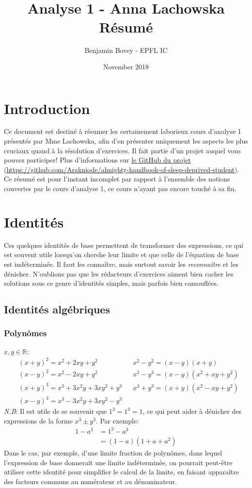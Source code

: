 \documentclass{article}
\title{\vspace{-1.5cm}	Analyse 1 -  Anna Lachowska \\
							Résumé}
\author{Benjamin Bovey - EPFL IC}
\date{November 2018}
\numberwithin{equation}{section}
\begin{document}
\maketitle

\section*{Introduction}
Ce document est destiné à résumer les certainement laborieux cours d'analyse 1 présentés par Mme Lachowska, afin d'en présenter uniquement les aspects les plus cruciaux quand à la résolution d'exercices. Il fait partie d'un projet auquel vous pouvez participer! Plus d'informations sur \href{https://github.com/Arakniode/almighty-handbook-of-sleep-deprived-student}{le GitHub du projet} (\url{https://github.com/Arakniode/almighty-handbook-of-sleep-deprived-student}). \\
Ce résumé est pour l'instant incomplet par rapport à l'ensemble des notions couvertes par le cours d'analyse 1, ce cours n'ayant pas encore touché à sa fin. 

\section{Identités}
Ces quelques identités de base permettent de transformer des expressions, ce qui est souvent utile lorsqu'on cherche leur limite et que celle de l'équation de base est indéterminée. Il faut les connaître, mais surtout savoir les \emph{reconnaître} et les dénicher. N'oublions pas que les rédacteurs d'exercices aiment bien cacher les solutions sous ce genre d'identités simples, mais parfois bien camouflées.
\subsection{Identités algébriques}
\subsubsection{Polynômes} 
\(x,y \in \mathbb{R}\):
\begin{align*}
	&(x+y)^2 = x^2 + 2xy + y^2 				& 	&x^2 - y^2 = (x - y)(x + y) \\
	&(x-y)^2 = x^2 - 2xy + y^2 					& 	&x^3 - y^3 = (x - y)(x^2 + xy + y^2) \\
	&(x+y)^3 = x^3 + 3x^2y + 3xy^2 + y^3 	& 	&x^3 + y^3 = (x + y)(x^2 - xy + y^2) \\
	&(x-y)^3 = x^3 - 3x^2y + 3xy^2 - y^3 
\end{align*}
\emph{N.B}: Il est utile de se souvenir que \(1^2 = 1^3 = 1\), ce qui peut aider à dénicher des expressions de la forme \(x^3 \pm y^3\). Par exemple:
\vspace{-0.2cm}
\begin{align*}
	1 - a^3 	&= 1^3 - a^3 \\
				&= (1-a)(1+a+a^2)
\end{align*}
Dans le cas, par exemple, d'une limite fraction de polynômes, dans lequel l'expression de base donnerait une limite indéterminée, on pourrait peut-être utiliser cette identité pour simplifier le calcul de la limite, en faisant apparaître des facteurs communs au numérateur et au dénominateur.
\end{document}
